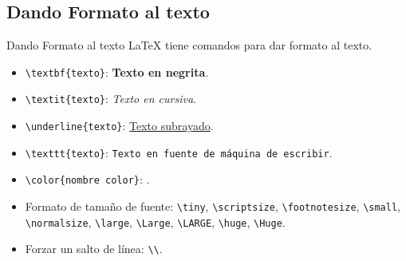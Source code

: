 \documentclass[12pt]{beamer}
\begin{document}
\subsection{Dando Formato al texto}
\begin{frame}{Dando Formato al texto}
  \LaTeX{} tiene comandos para dar formato al texto.
  \begin{itemize}
    \item<1-> {\color{blue}\texttt{\textbackslash textbf\{texto\}}}: \textbf{Texto en negrita}.
    \item <2-> {\color{blue}\texttt{\textbackslash textit\{texto\}}}: \textit{Texto en cursiva}.
    \item <3-> {\color{blue}\texttt{\textbackslash underline\{texto\}}}: \underline{Texto subrayado}.
    \item <4-> {\color{blue}\texttt{\textbackslash texttt\{texto\}}}: \texttt{Texto en fuente de máquina de escribir}.
    \item <5-> {\color{blue}\texttt{\textbackslash color\{nombre color\}}}: \color{green}{Texto en color}.
    \item<6-> Formato de tamaño de fuente: {\color{blue}\texttt{\textbackslash tiny}}, {\color{blue}\texttt{\textbackslash scriptsize}}, {\color{blue}\texttt{\textbackslash footnotesize}}, {\color{blue}\texttt{\textbackslash small}}, {\color{blue}\texttt{\textbackslash normalsize}}, {\color{blue}\texttt{\textbackslash large}}, {\color{blue}\texttt{\textbackslash Large}}, {\color{blue}\texttt{\textbackslash LARGE}}, {\color{blue}\texttt{\textbackslash huge}}, {\color{blue}\texttt{\textbackslash Huge}}.
    \item<7-> Forzar un salto de línea: {\color{blue}\texttt{\textbackslash\textbackslash}}. 
  \end{itemize}
\end{frame}
\end{document}
